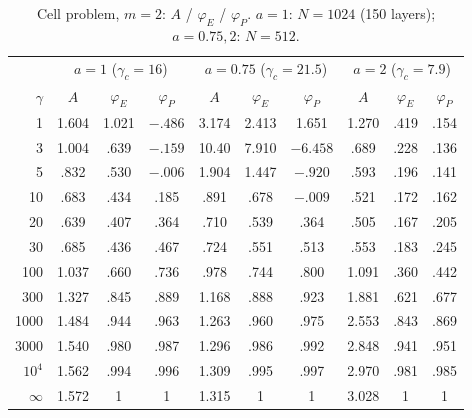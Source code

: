 \documentclass[11pt]{article}
\theoremstyle{remark}
\begin{document}
\begin{table}[h]\centering\small
\caption{Cell problem, $m=2$: $A$ / $\varphi_E$ / $\varphi_P$. $a=1$: $N=1024$ (150 layers); $a=0.75,2$: $N=512$.}\label{tab:cell}
\begin{tabular}{r|ccc|ccc|ccc}
\toprule
& \multicolumn{3}{c|}{$a=1$ ($\gamma_c=16$)} & \multicolumn{3}{c|}{$a=0.75$ ($\gamma_c=21.5$)} & \multicolumn{3}{c}{$a=2$ ($\gamma_c=7.9$)}\\
$\gamma$ & $A$ & $\varphi_E$ & $\varphi_P$ & $A$ & $\varphi_E$ & $\varphi_P$ & $A$ & $\varphi_E$ & $\varphi_P$\\
\midrule
1 & 1.604 & 1.021 & $-.486$ & 3.174 & 2.413 & 1.651 & 1.270 & .419 & .154\\
3 & 1.004 & .639 & $-.159$ & 10.40 & 7.910 & $-6.458$ & .689 & .228 & .136\\
5 & .832 & .530 & $-.006$ & 1.904 & 1.447 & $-.920$ & .593 & .196 & .141\\
10 & .683 & .434 & .185 & .891 & .678 & $-.009$ & .521 & .172 & .162\\
20 & .639 & .407 & .364 & .710 & .539 & .364 & .505 & .167 & .205\\
30 & .685 & .436 & .467 & .724 & .551 & .513 & .553 & .183 & .245\\
100 & 1.037 & .660 & .736 & .978 & .744 & .800 & 1.091 & .360 & .442\\
300 & 1.327 & .845 & .889 & 1.168 & .888 & .923 & 1.881 & .621 & .677\\
1000 & 1.484 & .944 & .963 & 1.263 & .960 & .975 & 2.553 & .843 & .869\\
3000 & 1.540 & .980 & .987 & 1.296 & .986 & .992 & 2.848 & .941 & .951\\
$10^4$ & 1.562 & .994 & .996 & 1.309 & .995 & .997 & 2.970 & .981 & .985\\
$\infty$ & 1.572 & 1 & 1 & 1.315 & 1 & 1 & 3.028 & 1 & 1\\
\bottomrule
\end{tabular}
\end{table}
\end{document}
